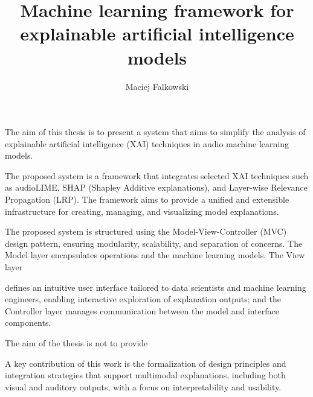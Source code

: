 \documentclass[
    bindingoffset=5mm,  %
    footnoteindent=3mm, %
    hyphenation=true    %
]{src/wut-thesis}
\begin{document}
\title{
    Machine learning framework for explainable artificial intelligence models
}
\author{Maciej Falkowski}
\date{\the\year}
\maketitle

\cleardoublepage %
\abstract
The aim of this thesis is to present a system that aims to simplify the analysis of explainable artificial intelligence (XAI) techniques in audio machine learning models.

The proposed system is a framework that integrates selected XAI techniques such as
audioLIME, SHAP (Shapley Additive explanations), and Layer-wise Relevance Propagation (LRP). The framework aims to provide a unified and extensible infrastructure for creating, managing, and visualizing model explanations.

The proposed system is structured using the Model-View-Controller (MVC) design pattern, ensuring modularity, scalability, and separation of concerns. The Model layer encapsulates operations and the machine learning models. The View layer 

defines an intuitive user interface tailored to data scientists and machine learning engineers, enabling interactive exploration of explanation outputs; and the Controller layer manages communication between the model and interface components.

The aim of the thesis is not to provide 

A key contribution of this work is the formalization of design principles and integration strategies that support multimodal explanations, including both visual and auditory outputs, with a focus on interpretability and usability.
\end{document}
